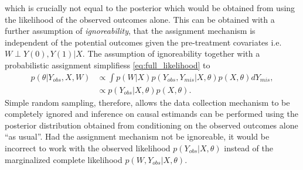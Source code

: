 \documentclass[11pt]{article}
\begin{document}
which is crucially not equal to the posterior which would be obtained from using the likelihood of the observed outcomes alone. This can be obtained with a further assumption of \textit{ignoreability}, that the assignment mechanism is independent of the potential outcomes given the pre-treatment covariates i.e. $W \perp Y(0), Y(1) | X$. The assumption of ignoreability together with a probabilistic assignment simplifiess \eqref{eq:full_likelihood} to
\begin{align*}
  p(\theta|Y_{obs}, X, W) &\propto \int p(W|X) p(Y_{obs},Y_{mis}|X, \theta) p(X,\theta) dY_{mis},\\
  &\propto p(Y_{obs}|X,\theta)p(X,\theta).
\end{align*}
Simple random sampling, therefore, allows the data collection mechanism to be completely ignored and inference on causal estimands can be performed using the posterior distribution obtained from conditioning on the observed outcomes alone ``as usual''. Had the assignment mechanism not be ignoreable, it would be incorrect to work with the observed likelihood $p(Y_{obs}|X,\theta)$ instead of the marginalized complete likelihood $p(W, Y_{obs}|X,\theta)$.


\end{document}
